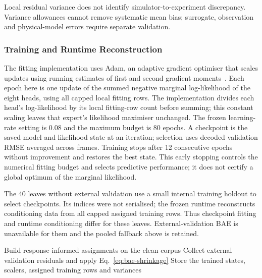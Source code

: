 Local residual variance does not identify simulator-to-experiment discrepancy. Variance allowances cannot remove systematic mean bias; surrogate, observation and physical-model errors require separate validation.

\subsubsection{Training and Runtime Reconstruction}
The fitting implementation uses Adam, an adaptive gradient optimiser
that scales updates using running estimates of first and second
gradient moments~\cite{kingma2015adam}. Each epoch here is one update
of the summed negative marginal log-likelihood of the eight heads,
using all capped local fitting rows. The implementation divides each
head's log-likelihood by its local fitting-row count before summing;
this constant scaling leaves that expert's likelihood maximiser unchanged.
The frozen learning-rate setting
is 0.08 and the maximum budget is 80 epochs. A checkpoint is the saved
model and likelihood state at an iteration; selection uses decoded
validation RMSE averaged across frames. Training stops after 12
consecutive epochs without improvement and restores the best state.
This early stopping controls the numerical fitting budget and selects
predictive performance; it does not certify a global optimum of the
marginal likelihood.

The 40 leaves without external validation use a small internal training
holdout to select checkpoints. Its indices were not serialised; the
frozen runtime reconstructs conditioning data from all capped assigned
training rows. Thus checkpoint fitting and runtime conditioning differ
for these leaves. External-validation BAE is unavailable for them and
the pooled fallback above is retained.

\begin{algorithm}[!htbp]
\caption{Offline construction of the reported forward bank.}
\label{alg:train}
Build response-informed assignments on the clean corpus\;
Collect external validation residuals and apply
Eq.~\eqref{eq:bae-shrinkage}\;
Store the trained states, scalers, assigned training rows and variances\;
\end{algorithm}

